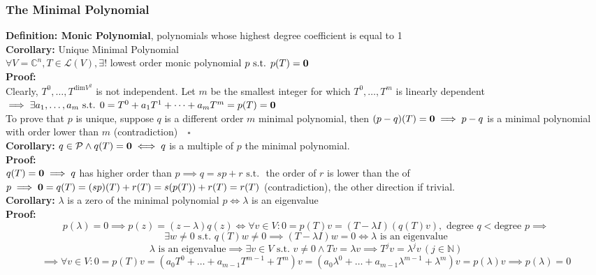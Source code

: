 \documentclass{article}
\newcommand{\N}{\mathbb{N}}
\newcommand{\st}{\mbox{ s.t. }}
\newcommand{\0}{{\bf{0}}}
\begin{document}
\subsubsection{The Minimal Polynomial}
\textbf{Definition: Monic Polynomial}, polynomials whose highest degree coefficient is equal to 1\\
\textbf{Corollary:} Unique Minimal Polynomial\\
$\forall V=\mathbb{C}^n,T\in\mathcal{L}(V),\exists!$ lowest order monic polynomial $p\st p(T)=\0$\\
\textbf{Proof:}\\
Clearly, $T^0,\dots,T^{\mbox{dim}V^2}$ is not independent. Let $m$ be the smallest integer for which $T^0,\dots,T^m$ is linearly dependent$\implies\exists a_1,\dots,a_m\st0=T^0+a_1T^1+\dots+a_mT^m=p(T)=\0$\\
To prove that $p$ is unique, suppose $q$ is a different order $m$ minimal polynomial, then $(p-q)(T)=\0\implies p-q$ is a minimal polynomial with order lower than $m$ (contradiction)$\quad\square$\\
\textbf{Corollary:} $q\in\mathcal{P}\land q(T)=\0\iff q$ is a multiple of $p$ the minimal polynomial.\\
\textbf{Proof:}\\
$q(T)=\0\implies q$ has higher order than $p\implies q=sp+r\st$ the order of $r$ is lower than the of $p\implies\0=q(T)=(sp)(T)+r(T)=s(p(T))+r(T)=r(T)$ (contradiction), the other direction if trivial.\\
\textbf{Corollary:} $\lambda$ is a zero of the minimal polynomial $p\iff\lambda$ is an eigenvalue\\
\textbf{Proof:}\\
$$p(\lambda)=0\implies p(z)=(z-\lambda)q(z)\iff\forall v\in V:0=p(T)v=(T-\lambda I)(q(T)v),\mbox{ degree }q<\mbox{degree }p\implies$$
$$\exists w\neq0\st q(T)w\neq0\implies(T-\lambda I)w=0\iff\lambda\mbox{ is an eigenvalue}$$
$$\lambda\mbox{ is an eigenvalue}\implies\exists v\in V\st v\neq0\land Tv=\lambda v\implies T^jv=\lambda^jv\,(j\in\N)$$
$$\implies\forall v\in V:0=p(T)v=(a_0T^0+\dots+a_{m-1}T^{m-1}+T^m)v=(a_0\lambda^0+\dots+a_{m-1}\lambda^{m-1}+\lambda^m)v=p(\lambda)v\implies p(\lambda)=0$$
\end{document}
